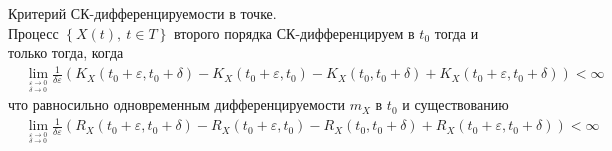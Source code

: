 \begin{theorem}
    Критерий СК-дифференцируемости в точке.
    \\
    Процесс $\left\{ X(t), \ t \in T \right\}$ второго порядка СК-дифференцируем
    в $t_0$ тогда и только тогда, когда
    \begin{align*}
      & \lim_{^{\varepsilon \to 0}_{\delta \to 0}}\frac{1}{\delta \varepsilon}\left( K_X(t_0+\varepsilon, t_0+\delta) - K_X(t_0+\varepsilon, t_0) - K_X(t_0, t_0+\delta) + K_X(t_0+\varepsilon, t_0+\delta)\right) < \infty
    \end{align*}
    что равносильно одновременным дифференцируемости $m_X$ в $t_0$ и
    существованию
    \begin{align*}
      & \lim_{^{\varepsilon \to 0}_{\delta \to 0}}\frac{1}{\delta \varepsilon}\left( R_X(t_0+\varepsilon, t_0+\delta) - R_X(t_0+\varepsilon, t_0) - R_X(t_0, t_0+\delta) + R_X(t_0+\varepsilon, t_0+\delta)\right) < \infty
    \end{align*}
\end{theorem}
